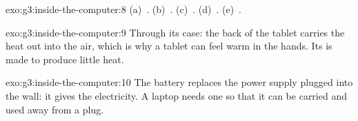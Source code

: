 \begin{solution}{exo:g3:inside-the-computer:8}
(a)~. (b)~. (c)~. (d)~. (e)~.
\end{solution}

\begin{solution}{exo:g3:inside-the-computer:9}
Through its case: the back of the tablet carries the heat out into the air,
which is why a tablet can feel warm in the hands. Its  is made to
produce little heat.
\end{solution}

\begin{solution}{exo:g3:inside-the-computer:10}
The battery replaces the power supply plugged into the wall: it gives the
electricity. A laptop needs one so that it can be carried and used away from a
plug.
\end{solution}
